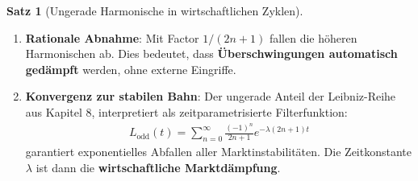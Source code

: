 \documentclass[a4paper, 12pt, twoside, openright]{report}
\theoremstyle{definition}
\theoremstyle{definition}
\newtheorem{satz}{Satz}[chapter]
\begin{document}
\begin{satz}[Ungerade Harmonische in wirtschaftlichen Zyklen]
\begin{enumerate}
\item \textbf{Rationale Abnahme}: Mit Factor $1/(2n+1)$ fallen die höheren Harmonischen ab. Dies bedeutet, dass \textbf{Überschwingungen automatisch gedämpft} werden, ohne externe Eingriffe.

\item \textbf{Konvergenz zur stabilen Bahn}: Der ungerade Anteil der Leibniz-Reihe aus Kapitel 8, interpretiert als zeitparametrisierte Filterfunktion:
\begin{align}
L_{\text{odd}}(t) = \sum_{n=0}^{\infty} \frac{(-1)^n}{2n+1} e^{-\lambda(2n+1)t}
\end{align}
garantiert exponentielles Abfallen aller Marktinstabilitäten. Die Zeitkonstante $\lambda$ ist dann die \textbf{wirtschaftliche Marktdämpfung}.

\end{enumerate}

\end{satz}
\end{document}
